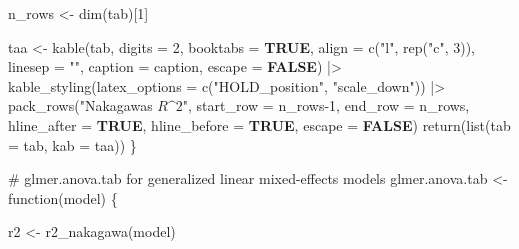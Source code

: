 \documentclass[
  bookmarksnumbered]{article}
\newenvironment{Shaded}{\begin{snugshade}}{\end{snugshade}}
\newcommand{\AttributeTok}[1]{\textcolor[rgb]{0.80,0.80,0.80}{#1}}
\newcommand{\CommentTok}[1]{\textcolor[rgb]{0.50,0.62,0.50}{#1}}
\newcommand{\ConstantTok}[1]{\textcolor[rgb]{0.86,0.64,0.64}{\textbf{#1}}}
\newcommand{\ControlFlowTok}[1]{\textcolor[rgb]{0.94,0.87,0.69}{#1}}
\newcommand{\DecValTok}[1]{\textcolor[rgb]{0.86,0.86,0.80}{#1}}
\newcommand{\FunctionTok}[1]{\textcolor[rgb]{0.94,0.94,0.56}{#1}}
\newcommand{\NormalTok}[1]{\textcolor[rgb]{0.80,0.80,0.80}{#1}}
\newcommand{\OtherTok}[1]{\textcolor[rgb]{0.94,0.94,0.56}{#1}}
\newcommand{\SpecialCharTok}[1]{\textcolor[rgb]{0.86,0.64,0.64}{#1}}
\newcommand{\StringTok}[1]{\textcolor[rgb]{0.80,0.58,0.58}{#1}}
\begin{document}
\begin{Shaded}
\begin{Highlighting}[]
\NormalTok{  n\_rows }\OtherTok{\textless{}{-}} \FunctionTok{dim}\NormalTok{(tab)[}\DecValTok{1}\NormalTok{]}
  
\NormalTok{  taa }\OtherTok{\textless{}{-}} \FunctionTok{kable}\NormalTok{(tab,}
               \AttributeTok{digits =} \DecValTok{2}\NormalTok{,}
               \AttributeTok{booktabs =} \ConstantTok{TRUE}\NormalTok{,}
               \AttributeTok{align =} \FunctionTok{c}\NormalTok{(}\StringTok{"l"}\NormalTok{, }\FunctionTok{rep}\NormalTok{(}\StringTok{"c"}\NormalTok{, }\DecValTok{3}\NormalTok{)),}
               \AttributeTok{linesep =} \StringTok{""}\NormalTok{,}
               \AttributeTok{caption =}\NormalTok{ caption,}
               \AttributeTok{escape =} \ConstantTok{FALSE}\NormalTok{) }\SpecialCharTok{|\textgreater{}}
    \FunctionTok{kable\_styling}\NormalTok{(}\AttributeTok{latex\_options =} \FunctionTok{c}\NormalTok{(}\StringTok{"HOLD\_position"}\NormalTok{, }\StringTok{"scale\_down"}\NormalTok{)) }\SpecialCharTok{|\textgreater{}}
    \FunctionTok{pack\_rows}\NormalTok{(}\StringTok{"Nakagawa\textquotesingle{}s $R\^{}2$"}\NormalTok{,}
              \AttributeTok{start\_row =}\NormalTok{ n\_rows}\DecValTok{{-}1}\NormalTok{, }\AttributeTok{end\_row =}\NormalTok{ n\_rows,}
              \AttributeTok{hline\_after =} \ConstantTok{TRUE}\NormalTok{, }\AttributeTok{hline\_before =} \ConstantTok{TRUE}\NormalTok{,}
              \AttributeTok{escape =} \ConstantTok{FALSE}\NormalTok{)}
  \FunctionTok{return}\NormalTok{(}\FunctionTok{list}\NormalTok{(}\AttributeTok{tab =}\NormalTok{ tab, }\AttributeTok{kab =}\NormalTok{ taa))}
\NormalTok{\}}

\CommentTok{\# glmer.anova.tab for generalized linear mixed{-}effects models}
\NormalTok{glmer.anova.tab }\OtherTok{\textless{}{-}} \ControlFlowTok{function}\NormalTok{(model) \{}
  
\NormalTok{  r2 }\OtherTok{\textless{}{-}} \FunctionTok{r2\_nakagawa}\NormalTok{(model)}
  

\end{Highlighting}
\end{Shaded}
\end{document}
